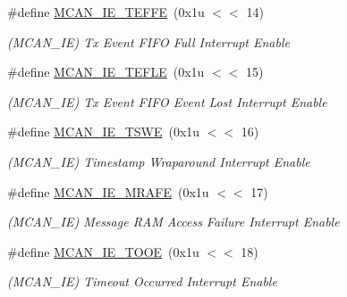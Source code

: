 \begin{DoxyCompactItemize}
\mbox{\label{group__SAMV71__MCAN_ga192993fa1244bcfb8717d55db440943d}} 
\#define \mbox{\hyperlink{group__SAMV71__MCAN_ga192993fa1244bcfb8717d55db440943d}{M\+C\+A\+N\+\_\+\+I\+E\+\_\+\+T\+E\+F\+FE}}~(0x1u $<$$<$ 14)
\begin{DoxyCompactList}\small\item\em (M\+C\+A\+N\+\_\+\+IE) Tx Event F\+I\+FO Full Interrupt Enable \end{DoxyCompactList}\item 
\mbox{\label{group__SAMV71__MCAN_gac17cd252e27c0043311eb71af3a35154}} 
\#define \mbox{\hyperlink{group__SAMV71__MCAN_gac17cd252e27c0043311eb71af3a35154}{M\+C\+A\+N\+\_\+\+I\+E\+\_\+\+T\+E\+F\+LE}}~(0x1u $<$$<$ 15)
\begin{DoxyCompactList}\small\item\em (M\+C\+A\+N\+\_\+\+IE) Tx Event F\+I\+FO Event Lost Interrupt Enable \end{DoxyCompactList}\item 
\mbox{\label{group__SAMV71__MCAN_ga3e16fcb2d6aa7839c147c13a97cdce97}} 
\#define \mbox{\hyperlink{group__SAMV71__MCAN_ga3e16fcb2d6aa7839c147c13a97cdce97}{M\+C\+A\+N\+\_\+\+I\+E\+\_\+\+T\+S\+WE}}~(0x1u $<$$<$ 16)
\begin{DoxyCompactList}\small\item\em (M\+C\+A\+N\+\_\+\+IE) Timestamp Wraparound Interrupt Enable \end{DoxyCompactList}\item 
\mbox{\label{group__SAMV71__MCAN_gaa2e97232159ed775d0a0b56fcbd59a6a}} 
\#define \mbox{\hyperlink{group__SAMV71__MCAN_gaa2e97232159ed775d0a0b56fcbd59a6a}{M\+C\+A\+N\+\_\+\+I\+E\+\_\+\+M\+R\+A\+FE}}~(0x1u $<$$<$ 17)
\begin{DoxyCompactList}\small\item\em (M\+C\+A\+N\+\_\+\+IE) Message R\+AM Access Failure Interrupt Enable \end{DoxyCompactList}\item 
\mbox{\label{group__SAMV71__MCAN_ga62a8d3f9d914a773aab9a332ef4acaa6}} 
\#define \mbox{\hyperlink{group__SAMV71__MCAN_ga62a8d3f9d914a773aab9a332ef4acaa6}{M\+C\+A\+N\+\_\+\+I\+E\+\_\+\+T\+O\+OE}}~(0x1u $<$$<$ 18)
\begin{DoxyCompactList}\small\item\em (M\+C\+A\+N\+\_\+\+IE) Timeout Occurred Interrupt Enable \end{DoxyCompactList}\item 
$$
\end{DoxyCompactItemize}
